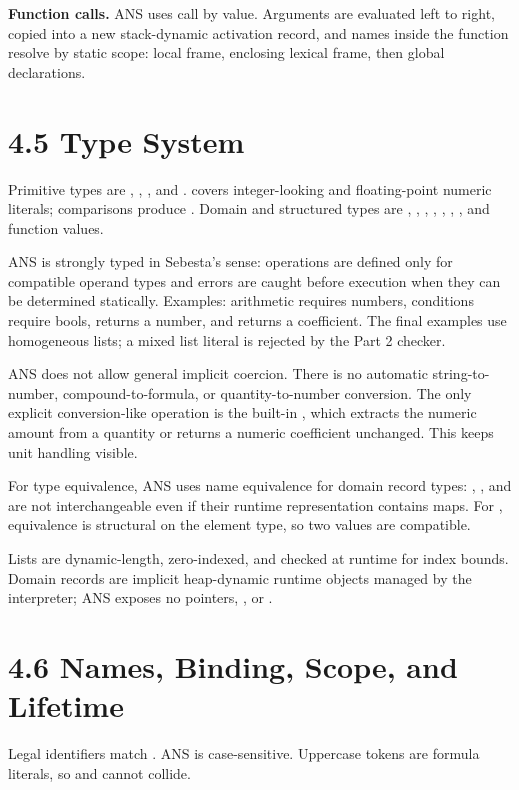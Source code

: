 \textbf{Function calls.} ANS uses call by value. Arguments are evaluated left to right, copied into a new stack-dynamic activation record, and names inside the function resolve by static scope: local frame, enclosing lexical frame, then global declarations.

\newpage
\section{4.5 Type System}
Primitive types are , , , and .  covers integer-looking and floating-point numeric literals; comparisons produce . Domain and structured types are , , , , , , , and function values.

ANS is strongly typed in Sebesta's sense: operations are defined only for compatible operand types and errors are caught before execution when they can be determined statically. Examples: arithmetic requires numbers,  conditions require bools,  returns a number, and  returns a coefficient. The final examples use homogeneous lists; a mixed list literal is rejected by the Part 2 checker.

ANS does not allow general implicit coercion. There is no automatic string-to-number, compound-to-formula, or quantity-to-number conversion. The only explicit conversion-like operation is the built-in , which extracts the numeric amount from a quantity or returns a numeric coefficient unchanged. This keeps unit handling visible.

For type equivalence, ANS uses name equivalence for domain record types: , , and  are not interchangeable even if their runtime representation contains maps. For , equivalence is structural on the element type, so two  values are compatible.

Lists are dynamic-length, zero-indexed, and checked at runtime for index bounds. Domain records are implicit heap-dynamic runtime objects managed by the interpreter; ANS exposes no pointers, , or .

\newpage
\section{4.6 Names, Binding, Scope, and Lifetime}
Legal identifiers match \code{[a-z\_][A-Za-z0-9\_]*}. ANS is case-sensitive. Uppercase tokens are formula literals, so  and  cannot collide.

